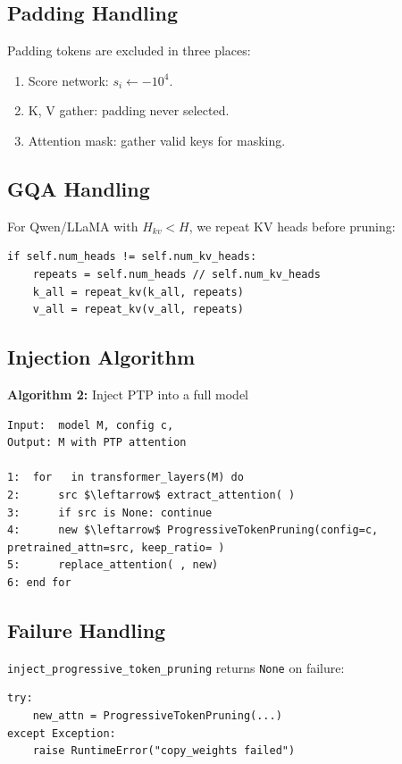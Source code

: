 {\subsection{Padding Handling}

Padding tokens are excluded in three places:
\begin{enumerate}
\item Score network: $s_i \leftarrow -10^4$.
\item K, V gather: padding never selected.
\item Attention mask: gather valid keys for masking.

\end{enumerate}
\subsection{GQA Handling}

For Qwen/LLaMA with $H_{kv} < H$, we repeat KV heads before pruning:

\begin{lstlisting}
if self.num_heads != self.num_kv_heads:
    repeats = self.num_heads // self.num_kv_heads
    k_all = repeat_kv(k_all, repeats)
    v_all = repeat_kv(v_all, repeats)
\end{lstlisting}

\subsection{Injection Algorithm}

\textbf{Algorithm 2:} Inject PTP into a full model
\begin{lstlisting}
Input:  model M, config c,  
Output: M with PTP attention

1:  for   in transformer_layers(M) do
2:      src $\leftarrow$ extract_attention( )
3:      if src is None: continue
4:      new $\leftarrow$ ProgressiveTokenPruning(config=c, pretrained_attn=src, keep_ratio= )
5:      replace_attention( , new)
6: end for
\end{lstlisting}

\subsection{Failure Handling}

\texttt{inject\_progressive\_token\_pruning} returns \texttt{None} on failure:

\begin{lstlisting}
try:
    new_attn = ProgressiveTokenPruning(...)
except Exception:
    raise RuntimeError("copy_weights failed")
\end{lstlisting}

}
